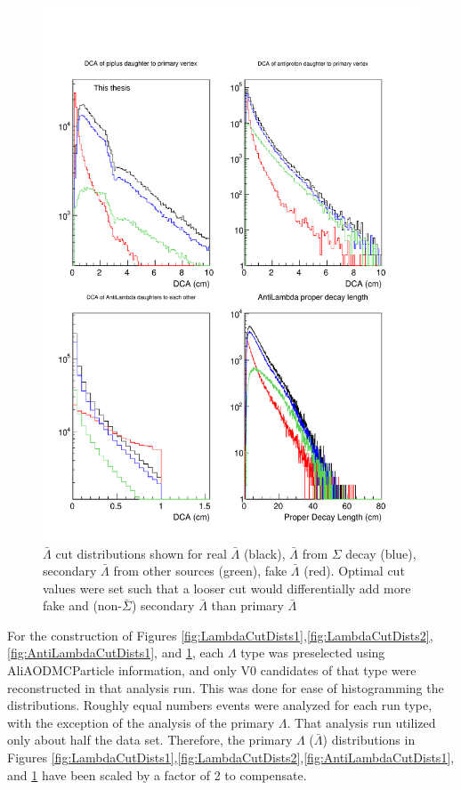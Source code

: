 \begin{figure}
\includegraphics[width=36pc]{Figures/2014-03-31-Distribution-AntiLambda-4Types-DCA-DCA-DCA-DecayLength.pdf}
\caption[$\bar{\Lambda}$ cut distributions]{$\bar{\Lambda}$ cut distributions shown for real $\bar{\Lambda}$ (black), $\bar{\Lambda}$ from $\Sigma$ decay (blue), secondary $\bar{\Lambda}$ from other sources (green), fake $\bar{\Lambda}$ (red). 
Optimal cut values were set such that a looser cut would differentially add more fake and (non-$\bar{\Sigma}$) secondary $\bar{\Lambda}$ than primary $\bar{\Lambda}$}
\label{fig:AntiLambdaCutDists2}
\end{figure}

For the construction of Figures \ref{fig:LambdaCutDists1},\ref{fig:LambdaCutDists2},\ref{fig:AntiLambdaCutDists1}, and \ref{fig:AntiLambdaCutDists2}, each $\Lambda$ type was preselected using AliAODMCParticle information, and only V0 candidates of that type were reconstructed in that analysis run. 
This was done for ease of histogramming the distributions.  
Roughly equal numbers events were analyzed for each run type, with the exception of the analysis of the primary $\Lambda$.  That analysis run utilized only about half the data set.  
Therefore, the primary $\Lambda$ ($\bar{\Lambda}$) distributions in Figures \ref{fig:LambdaCutDists1},\ref{fig:LambdaCutDists2},\ref{fig:AntiLambdaCutDists1}, and \ref{fig:AntiLambdaCutDists2} have been scaled by a factor of 2 to compensate.

